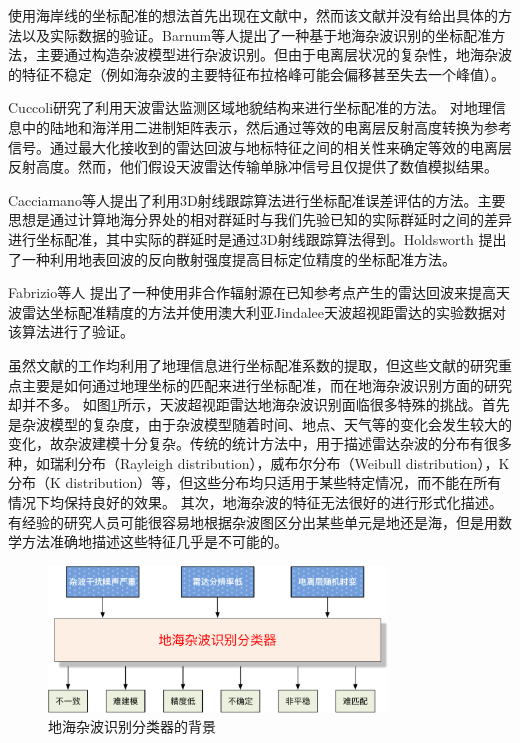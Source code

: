 使用海岸线的坐标配准的想法首先出现在文献\cite{wheadon1994ionospheric}中，然而该文献并没有给出具体的方法以及实际数据的验证。Barnum等人提出了一种基于地海杂波识别的坐标配准方法，主要通过构造杂波模型进行杂波识别。但由于电离层状况的复杂性，地海杂波的特征不稳定（例如海杂波的主要特征布拉格峰可能会偏移甚至失去一个峰值）。

Cuccoli研究了利用天波雷达监测区域地貌结构来进行坐标配准的方法。
对地理信息中的陆地和海洋用二进制矩阵表示，然后通过等效的电离层反射高度转换为参考信号。通过最大化接收到的雷达回波与地标特征之间的相关性来确定等效的电离层反射高度。然而，他们假设天波雷达传输单脉冲信号且仅提供了数值模拟结果。

Cacciamano等人提出了利用3D射线跟踪算法进行坐标配准误差评估的方法。主要思想是通过计算地海分界处的相对群延时与我们先验已知的实际群延时之间的差异进行坐标配准，其中实际的群延时是通过3D射线跟踪算法得到。Holdsworth 提出了一种利用地表回波的反向散射强度提高目标定位精度的坐标配准方法。

Fabrizio等人 提出了一种使用非合作辐射源在已知参考点产生的雷达回波来提高天波雷达坐标配准精度的方法并使用澳大利亚Jindalee天波超视距雷达的实验数据对该算法进行了验证。

虽然文献\cite{barnum1998over, weijers1995oth, fabrizio2016using, wheadon1994ionospheric, cuccoli2009over, cuccoli2009over2, cuccoli2010sea, cuccoli2011coordinate, cacciamano2012coordinate}的工作均利用了地理信息进行坐标配准系数的提取，但这些文献的研究重点主要是如何通过地理坐标的匹配来进行坐标配准，而在地海杂波识别方面的研究却并不多。
如图\ref{fig:clutterproblem}所示，天波超视距雷达地海杂波识别面临很多特殊的挑战。首先是杂波模型的复杂度，由于杂波模型随着时间、地点、天气等的变化会发生较大的变化，故杂波建模十分复杂。传统的统计方法中，用于描述雷达杂波的分布有很多种，如瑞利分布（Rayleigh distribution），威布尔分布（Weibull distribution），K分布（K distribution）等，但这些分布均只适用于某些特定情况，而不能在所有情况下均保持良好的效果。
其次，地海杂波的特征无法很好的进行形式化描述。有经验的研究人员可能很容易地根据杂波图区分出某些单元是地还是海，但是用数学方法准确地描述这些特征几乎是不可能的。
\begin{figure}[hbt]
	\centering
	\includegraphics[width=9cm]{figures/othr/othr_classification.pdf}
	\caption{地海杂波识别分类器的背景}
	\label{fig:clutterproblem}
\end{figure}

